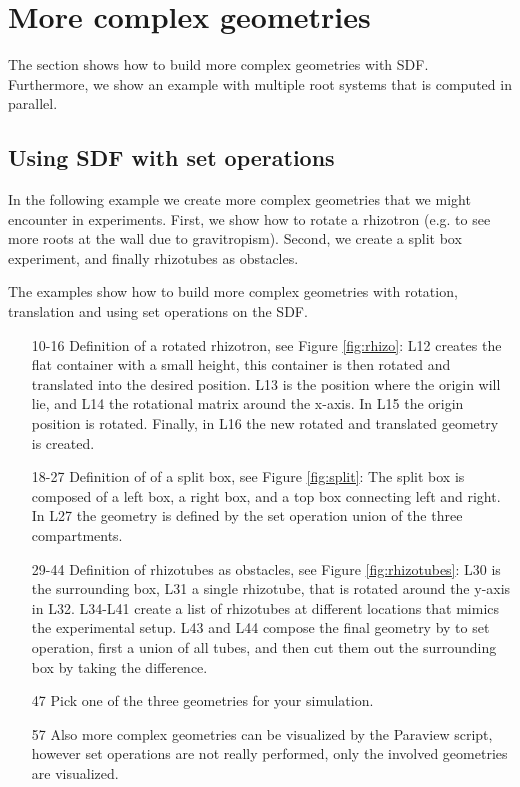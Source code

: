 \documentclass[a4paper]{article}
\begin{document}
\section{More complex geometries}

The section shows how to build more complex geometries with SDF. 
Furthermore, we show an example with multiple root systems that is computed in parallel.

\subsection{Using SDF with set operations}

In the following example we create more complex geometries that we might encounter in experiments. 
First, we show how to rotate a rhizotron (e.g. to see more roots at the wall due to gravitropism). 
Second, we create a split box experiment, and finally rhizotubes as obstacles.

The examples show how to build more complex geometries with rotation, translation and using set operations on the SDF.



\begin{itemize}

\item[10-16] Definition of a rotated rhizotron, see Figure \ref{fig:rhizo}: L12 creates the flat container with a small height, this container is then rotated and translated into the desired position. 
L13 is the position where the origin will lie, and L14 the rotational matrix around the x-axis. 
In L15 the origin position is rotated. Finally, in L16 the new rotated and translated geometry is created. 
 
\item[18-27] Definition of of a split box, see Figure \ref{fig:split}: The split box is composed of a left box, a right box, and a top box connecting left and right. In L27 the geometry is defined by the set operation union of the three compartments. 
 
\item[29-44] Definition of rhizotubes as obstacles, see Figure \ref{fig:rhizotubes}: L30 is the surrounding box, L31 a single rhizotube, that is rotated around the y-axis in L32. L34-L41 create a list of rhizotubes at different locations that mimics the experimental setup. 
L43 and L44 compose the final geometry by to set operation, first a union of all tubes, and then cut them out the surrounding box by taking the difference. 
 
\item[47] Pick one of the three geometries for your simulation.
 
\item[57] Also more complex geometries can be visualized by the Paraview script, however set operations are not really performed, only the involved geometries are visualized.

\end{itemize}
\end{document}

